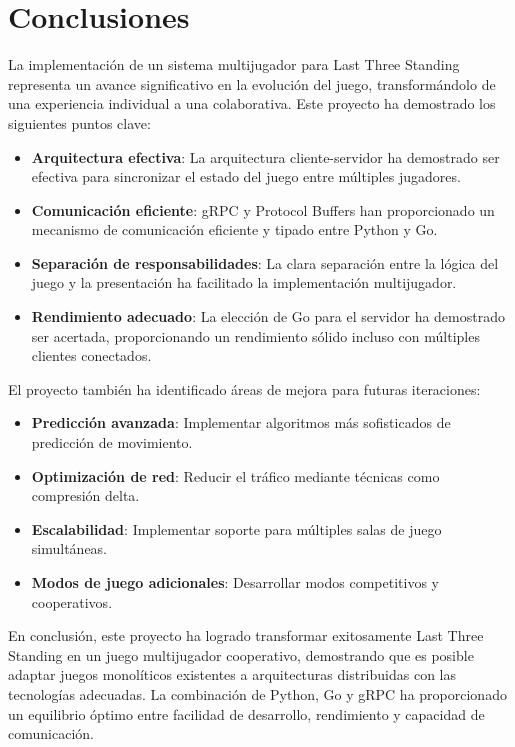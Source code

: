 \documentclass[11pt,letterpaper]{article}
\begin{document}
\section{Conclusiones}

La implementación de un sistema multijugador para Last Three Standing representa un avance significativo en la evolución del juego, transformándolo de una experiencia individual a una colaborativa. Este proyecto ha demostrado los siguientes puntos clave:

\begin{itemize}
    \item \textbf{Arquitectura efectiva}: La arquitectura cliente-servidor ha demostrado ser efectiva para sincronizar el estado del juego entre múltiples jugadores.
    
    \item \textbf{Comunicación eficiente}: gRPC y Protocol Buffers han proporcionado un mecanismo de comunicación eficiente y tipado entre Python y Go.
    
    \item \textbf{Separación de responsabilidades}: La clara separación entre la lógica del juego y la presentación ha facilitado la implementación multijugador.
    
    \item \textbf{Rendimiento adecuado}: La elección de Go para el servidor ha demostrado ser acertada, proporcionando un rendimiento sólido incluso con múltiples clientes conectados.
\end{itemize}

El proyecto también ha identificado áreas de mejora para futuras iteraciones:

\begin{itemize}
    \item \textbf{Predicción avanzada}: Implementar algoritmos más sofisticados de predicción de movimiento.
    
    \item \textbf{Optimización de red}: Reducir el tráfico mediante técnicas como compresión delta.
    
    \item \textbf{Escalabilidad}: Implementar soporte para múltiples salas de juego simultáneas.
    
    \item \textbf{Modos de juego adicionales}: Desarrollar modos competitivos y cooperativos.
\end{itemize}

En conclusión, este proyecto ha logrado transformar exitosamente Last Three Standing en un juego multijugador cooperativo, demostrando que es posible adaptar juegos monolíticos existentes a arquitecturas distribuidas con las tecnologías adecuadas. La combinación de Python, Go y gRPC ha proporcionado un equilibrio óptimo entre facilidad de desarrollo, rendimiento y capacidad de comunicación.
\end{document}
